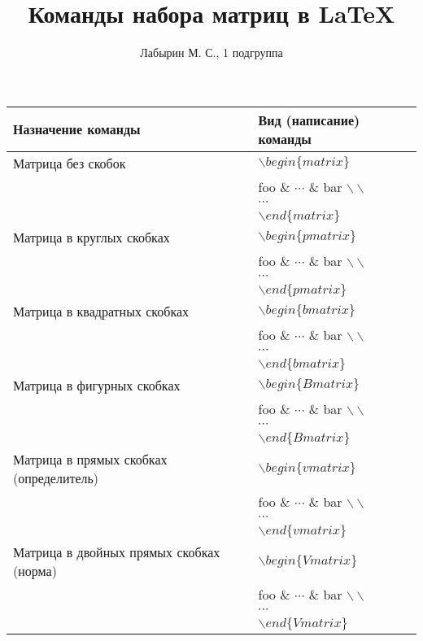 \documentclass[12pt]{article}
\author{Лабырин М. С., 1 подгруппа}
\title{Команды набора матриц в \LaTeX{}}
\begin{document}
\maketitle

\begin{center}
  \begin{tabular}{ || l | l || }

    \hline
    Назначение команды & Вид (написание) команды \\ \hline
    \hline

    Матрица без скобок &
    $\backslash begin\{matrix\}$ \\ &
    foo \& $\cdots$ \& bar $\backslash\backslash$ \\ &
    $\cdots$ \\ &
    $\backslash end\{matrix\}$ \\ \hline

    Матрица в круглых скобках &
    $\backslash begin\{pmatrix\}$ \\ &
    foo \& $\cdots$ \& bar $\backslash\backslash$ \\ &
    $\cdots$ \\ &
    $\backslash end\{pmatrix\}$ \\ \hline

    Матрица в квадратных скобках &
    $\backslash begin\{bmatrix\}$ \\ &
    foo \& $\cdots$ \& bar $\backslash\backslash$ \\ &
    $\cdots$ \\ &
    $\backslash end\{bmatrix\}$ \\ \hline

    Матрица в фигурных скобках &
    $\backslash begin\{Bmatrix\}$ \\ &
    foo \& $\cdots$ \& bar $\backslash\backslash$ \\ &
    $\cdots$ \\ &
    $\backslash end\{Bmatrix\}$ \\ \hline

    Матрица в прямых скобках (определитель) &
    $\backslash begin\{vmatrix\}$ \\ &
    foo \& $\cdots$ \& bar $\backslash\backslash$ \\ &
    $\cdots$ \\ &
    $\backslash end\{vmatrix\}$ \\ \hline

    Матрица в двойных прямых скобках (норма) &
    $\backslash begin\{Vmatrix\}$ \\ &
    foo \& $\cdots$ \& bar $\backslash\backslash$ \\ &
    $\cdots$ \\ &
    $\backslash end\{Vmatrix\}$ \\ \hline


\end{tabular}
\end{center}
\end{document}
